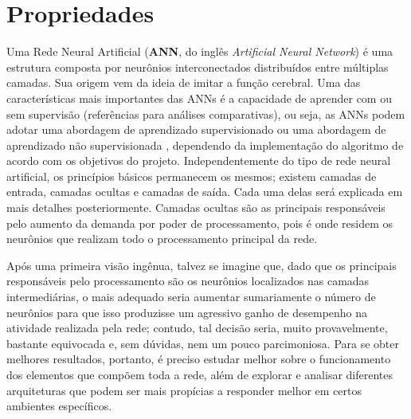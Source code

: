 




\linebreak
\newpage


\section{Propriedades}
\label{sec:ann_properties}

Uma Rede Neural Artificial (\textbf{ANN}, do inglês \textit{Artificial Neural Network}) é uma estrutura composta por neurônios interconectados distribuídos entre múltiplas camadas. Sua origem vem da ideia de imitar a função cerebral. Uma das características mais importantes das ANNs é a capacidade de aprender com ou sem supervisão (referências para análises comparativas), ou seja, as ANNs podem adotar uma abordagem de aprendizado supervisionado ou uma abordagem de aprendizado não supervisionada \citep{haykin1999neural}, dependendo da implementação do algoritmo de acordo com os objetivos do projeto. Independentemente do tipo de rede neural artificial, os princípios básicos permanecem os mesmos; existem camadas de entrada, camadas ocultas e camadas de saída. Cada uma delas será explicada em mais detalhes posteriormente. Camadas ocultas são as principais responsáveis pelo aumento da demanda por poder de processamento, pois é onde residem os neurônios que realizam todo o processamento principal da rede.


Após uma primeira visão ingênua, talvez se imagine que, dado que os principais responsáveis pelo processamento são os neurônios localizados nas camadas intermediárias, o mais adequado seria aumentar sumariamente o número de neurônios para que isso produzisse um agressivo ganho de desempenho na atividade realizada pela rede; contudo, tal decisão seria, muito provavelmente, bastante equivocada e, sem dúvidas, nem um pouco parcimoniosa. Para se obter melhores resultados, portanto, é preciso estudar melhor sobre o funcionamento dos elementos que compõem toda a rede, além de explorar e analisar diferentes arquiteturas que podem ser mais propícias a responder melhor em certos ambientes específicos.


